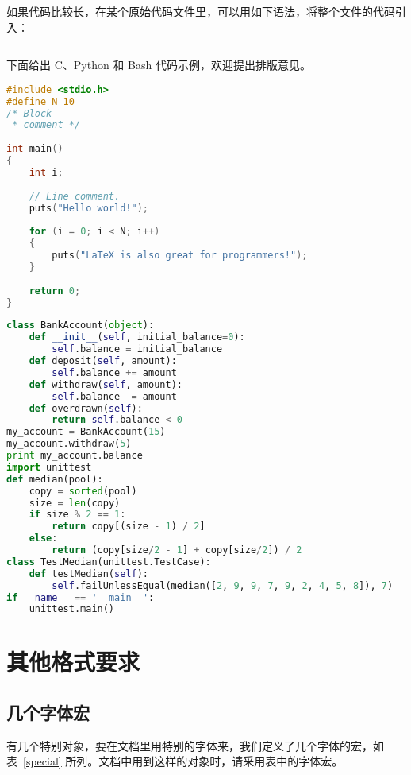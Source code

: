 如果代码比较长，在某个原始代码文件里，可以用如下语法，将整个文件的代码引入：
\begin{lstlisting}[language={[LaTeX]TeX},caption={引入代码文件示例}]

\end{lstlisting}

下面给出 C、Python 和 Bash 代码示例，欢迎提出排版意见。

\begin{lstlisting}[language=C,caption={C 代码示例},label=cLabel]
#include <stdio.h>
#define N 10
/* Block
 * comment */
 
int main()
{
    int i;
 
    // Line comment.
    puts("Hello world!");
 
    for (i = 0; i < N; i++)
    {
        puts("LaTeX is also great for programmers!");
    }
 
    return 0;
}
\end{lstlisting}

\begin{lstlisting}[language=python,caption={Python 代码示例},label=Python]
class BankAccount(object):
    def __init__(self, initial_balance=0):
        self.balance = initial_balance
    def deposit(self, amount):
        self.balance += amount
    def withdraw(self, amount):
        self.balance -= amount
    def overdrawn(self):
        return self.balance < 0
my_account = BankAccount(15)
my_account.withdraw(5)
print my_account.balance
import unittest
def median(pool):
    copy = sorted(pool)
    size = len(copy)
    if size % 2 == 1:
        return copy[(size - 1) / 2]
    else:
        return (copy[size/2 - 1] + copy[size/2]) / 2
class TestMedian(unittest.TestCase):
    def testMedian(self):
        self.failUnlessEqual(median([2, 9, 9, 7, 9, 2, 4, 5, 8]), 7)
if __name__ == '__main__':
    unittest.main()
\end{lstlisting}



\section{其他格式要求}
\subsection{几个字体宏}
有几个特别对象，要在文档里用特别的字体来，我们定义了几个字体的宏，如表~\ref{special} 所列。文档中用到这样的对象时，请采用表中的字体宏。

